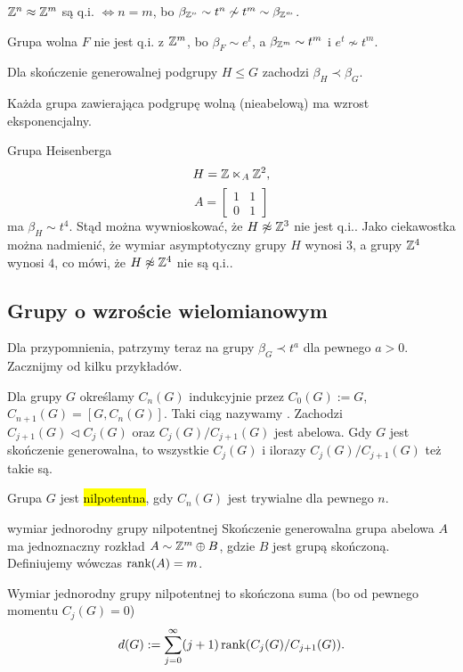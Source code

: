 \begin{example}[m]
\item $\mathbb{Z}^n\approx \mathbb{Z}^m$ są q.i. $\iff n=m$, bo $\beta_{\mathbb{Z}^n}\sim t^n\not\sim t^m\sim \beta_{\mathbb{Z}^m}$.
\item Grupa wolna $F$ nie jest q.i. z $\mathbb{Z}^m$, bo $\beta_F\sim e^t$, a $\beta_{\mathbb{Z}^m}\sim t^m$ i $e^t\not\sim t^m$.
\item Dla skończenie generowalnej podgrupy $H\leq G$ zachodzi $\beta_H\prec\beta_G$.
  \begin{conclusion}{}{}
    Każda grupa zawierająca podgrupę wolną (nieabelową) ma wzrost eksponencjalny.
  \end{conclusion}
\item Grupa Heisenberga 
  $$H=\mathbb{Z}\ltimes_A \mathbb{Z}^2,$$ 
  $$A=\begin{bmatrix}1&1\\0&1\end{bmatrix}$$ 
  ma $\beta_H\sim t^4$. Stąd można wywnioskować, że $H\not\approx\mathbb{Z}^3$ nie jest q.i.. Jako ciekawostka można nadmienić, że wymiar asymptotyczny grupy $H$ wynosi $3$, a grupy $\mathbb{Z}^4$ wynosi $4$, co mówi, że $H\not\approx\mathbb{Z}^4$ nie są q.i..
\end{example}

\subsection{Grupy o wzroście wielomianowym}

Dla przypomnienia, patrzymy teraz na grupy $\beta_G\prec t^a$ dla pewnego $a>0$. Zacznijmy od kilku przykładów.

Dla grupy $G$ określamy $C_n(G)$ indukcyjnie przez $C_0(G):=G$, $C_{n+1}(G)=[G, C_n(G)]$. Taki ciąg nazywamy . Zachodzi $C_{j+1}(G)\triangleleft C_j(G)$ oraz $C_j(G)/C_{j+1}(G)$ jest abelowa. Gdy $G$ jest skończenie generowalna, to wszystkie $C_j(G)$ i ilorazy $C_j(G)/C_{j+1}(G)$ też takie są.

Grupa $G$ jest \hl{nilpotentna}, gdy $C_n(G)$ jest trywialne dla pewnego $n$.

\begin{definition}{wymiar jednorodny grupy nilpotentnej}{}
  Skończenie generowalna grupa abelowa $A$ ma jednoznaczny rozkład $A\sim \mathbb{Z}^m\oplus B$, gdzie $B$ jest grupą skończoną. Definiujemy wówczas $\operatorname{rank}(A)=m$.

  Wymiar jednorodny grupy nilpotentnej to skończona suma (bo od pewnego momentu $C_j(G)=0$)
  $$d(G):=\sum_{j=0}^\infty (j+1)\operatorname{rank}(C_j(G)/C_{j+1}(G)).$$
\end{definition}

